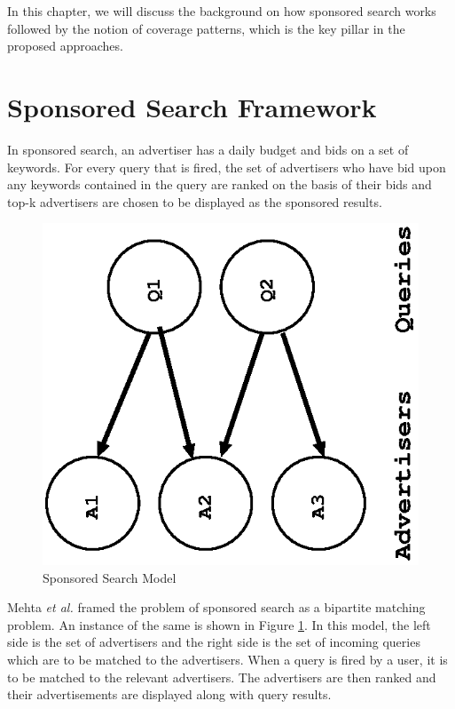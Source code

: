 In this chapter, we will discuss the background on how sponsored search works followed by the notion of coverage patterns, which is the key pillar in the proposed approaches.



\section{Sponsored Search Framework}
In sponsored search, an advertiser has a daily budget and bids on a set of keywords. For every query that is fired, the set of advertisers who have bid upon any keywords contained in the query are ranked on the basis of their bids and top-k advertisers are chosen to be displayed as the sponsored results.

\begin{figure}[h]
	\centering
\includegraphics[scale=0.55,angle = 270]{visuals/present_model.eps}
	\caption{Sponsored Search Model}
	\label{fig:adwords:model}
\end{figure}


Mehta {\it et al.} \cite{mehta2007adwords} framed the problem of sponsored search as a bipartite matching problem. An instance of the same is shown in Figure \ref{fig:adwords:model}. In this model, the left side is the set of advertisers and the right side is the set of incoming queries which are to be matched to the advertisers. When a query is fired by a user, it is to be matched to the relevant advertisers. The advertisers are then ranked and their advertisements are displayed along with query results.

